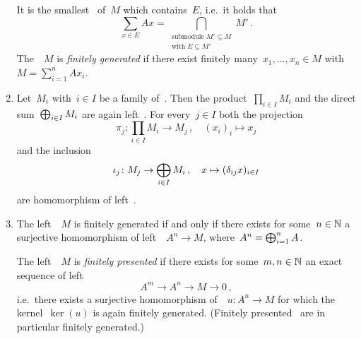 \begin{remarkdefinition}
\begin{enumerate}
      It is the smallest~{} of~$M$ which contains~$E$, i.e.\ it holds that
      \[
          \sum_{x \in E} Ax
        = \bigcap_{\substack{\text{submodule $M' \subseteq M$} \\ \text{with $E \subseteq M'$}}} M' \,.
      \]
      The~{}~$M$ is \emph{finitely generated} if there exist finitely many~$x_1, \dotsc, x_n \in M$ with~$M = \sum_{i=1}^n A x_i$.
    \item
      Let~$M_i$ with~$i \in I$ be a family of~{}.
      Then the product~$\prod_{i \in I} M_i$ and the direct sum~$\bigoplus_{i \in I} M_i$ are again left~{}.
      For every~$j \in I$ both the projection
      \[
                \pi_j
        \colon  \prod_{i \in I} M_i
        \to     M_j \,,
        \quad   (x_i)_i
        \mapsto x_j
      \]
      and the inclusion
      \[
                \iota_j
        \colon  M_j
        \to     \bigoplus_{i \in I} M_i \,,
        \quad   x
        \mapsto ( \delta_{ij} x )_{i \in I}
      \]
      are homomorphism of left~{}.
    \item
      The left~{}~$M$ is finitely generated if and only if there exists for some~$n \in \mathbb{N}$ a surjective homomorphism of left~{}~$A^n \to M$, where~$A^n = \bigoplus_{i=1}^n A$.
      
      The left~{}~$M$ is \emph{finitely presented} if there exists for some~$m, n \in \mathbb{N}$ an exact sequence of left~{}
      \[
            A^m
        \to A^n
        \to M
        \to 0 \,,
      \]
      i.e.~there exists a surjective homomorphism of~{}~$u \colon A^n \to M$ for which the kernel~$\ker(u)$ is again finitely generated.
      (Finitely presented~{} are in particular finitely generated.)
  \end{enumerate}
\end{remarkdefinition}


